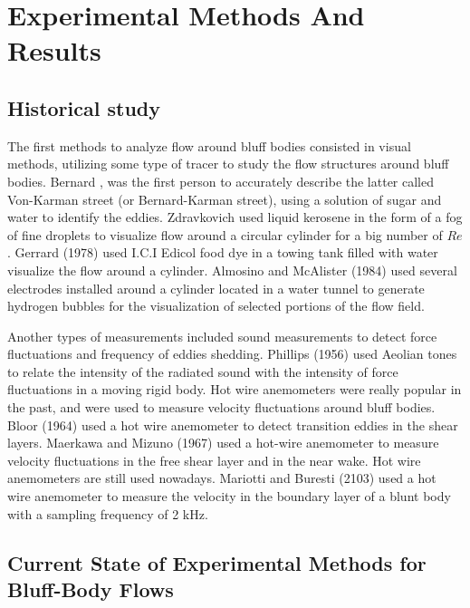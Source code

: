 \documentclass[journal]{new-aiaa}
\begin{document}
\clearpage
\section{Experimental Methods And Results} \label{sec:experimentalmethods}

\subsection{Historical study}
The first methods to analyze flow around bluff bodies consisted in visual methods, utilizing some type of tracer to study the flow structures around bluff bodies. Bernard \cite{Bernard1908a} \cite{Bernard1908b}, was the first person to accurately describe the latter called Von-Karman street (or Bernard-Karman street), using a solution of sugar and water to identify the eddies. Zdravkovich \citep{Zdravkovich1968} used liquid kerosene in the form of a fog of fine droplets to visualize flow around a circular cylinder for a big number of $Re$. Gerrard (1978) \cite{Gerrard1978} used I.C.I Edicol food dye in a towing tank filled with water visualize the flow around a cylinder. Almosino and McAlister (1984) \citep{Almosnino1984} used several electrodes installed around a cylinder located in a water tunnel to generate hydrogen bubbles for the visualization of selected portions of the flow field.

Another types of measurements included sound measurements to detect force fluctuations and frequency of eddies shedding. Phillips (1956) \citep{Phillips1956} used Aeolian tones to relate the intensity of the radiated sound with the intensity of force fluctuations in a moving rigid body. Hot wire anemometers were really popular in the past, and were used to measure velocity fluctuations around bluff bodies. Bloor (1964) used a hot wire anemometer to detect transition eddies in the shear layers. Maerkawa and Mizuno (1967) used a hot-wire anemometer to measure velocity fluctuations in the free shear layer and in the near wake. Hot wire anemometers are still used nowadays. Mariotti and Buresti (2103) \cite{Mariotti2013} used a hot wire anemometer to measure the velocity in the boundary layer of a blunt body with a sampling frequency of 2 kHz.

\subsection{Current State of Experimental Methods for Bluff-Body Flows} \label{subsec:currentstateexperimental}
\end{document}
